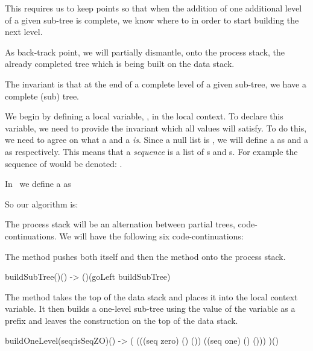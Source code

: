 This requires us to keep  points so that when the 
addition of one additional level of a given sub-tree is complete, we know 
where to  in order to start building the next level. 

As back-track point, we will partially dismantle, onto the process stack, 
the already completed tree which is being built on the data stack. 

The invariant is that at the end of a complete level of a given sub-tree, 
we have a complete (sub) tree. 

We begin by defining a local variable, , in the local context. 
To declare this variable, we need to provide the invariant which all 
values will satisfy. To do this, we need to agree on what a  
and a  \emph{is}. Since a null list is \type{()}, we will 
define a  as \type{(())} and a  as \type{(()())} 
respectively. This means that a  \emph{sequence} is a list 
of s and s. For example the sequence of 
 would be denoted: \type{( (()) (()()) (()) (()()) (()()) 
(()) )}. 

In \joylol\ we define a  as 

\starttyping
\startJoylolCode

\stopJoylolCode
\stoptyping

So our algorithm is:

The process stack will be an alternation between partial trees, 
code-continuations. We will have the following six code-continuations:

\startitemize

\item The  method pushes both itself and then the 
 method onto the process stack. 

\starttyping
\startJoylolCode
buildSubTree()() -> ()(goLeft buildSubTree)
\stopJoylolCode
\stoptyping

\item The  method takes the top of the data stack and 
places it into the  local context variable. It then builds a 
one-level sub-tree using the value of the  variable as a prefix 
and leaves the construction on the top of the data stack. 

\starttyping
\startJoylolCode
buildOneLevel(seq:isSeqZO)() -> (
  (((seq zero) () ()) ((seq one) () ()))
)()
\stopJoylolCode
\stoptyping

